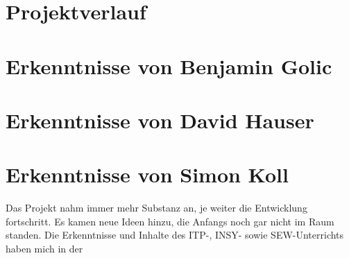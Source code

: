 \section{Projektverlauf}

\section{Erkenntnisse von Benjamin Golic}

\section{Erkenntnisse von David Hauser}

\section{Erkenntnisse von Simon Koll}

Das Projekt nahm immer mehr Substanz an, je weiter die Entwicklung fortschritt. Es kamen neue Ideen hinzu, die Anfangs noch gar nicht im Raum standen. Die Erkenntnisse und Inhalte des ITP-, INSY- sowie SEW-Unterrichts haben mich in der
